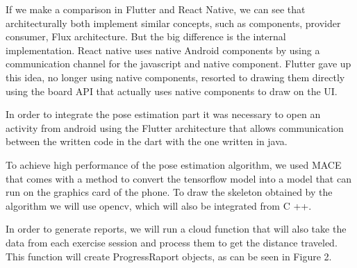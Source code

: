 If we make a comparison in Flutter and React Native, we can see that architecturally both implement similar concepts, such as components, provider consumer, Flux architecture.
But the big difference is the internal implementation.
React native uses native Android components by using a communication channel for the javascript and native component.
Flutter gave up this idea, no longer using native components, resorted to drawing them directly using the board API that actually uses native components to draw on the UI.

In order to integrate the pose estimation part it was necessary to open an activity from android using the Flutter architecture that allows communication between the written code in the dart with the one written in java.

To achieve high performance of the pose estimation algorithm, we used MACE that comes with a method to convert the tensorflow model into a model that can run on the graphics card of the phone.
To draw the skeleton obtained by the algorithm we will use opencv, which will also be integrated from C ++.

In order to generate reports, we will run a cloud function that will also take the data from each exercise session and process them to get the distance traveled. This function will create ProgressRaport objects, as can be seen in Figure 2.


